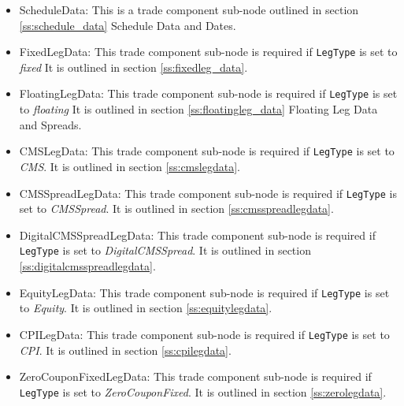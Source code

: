 \begin{itemize}
\item ScheduleData: This is a trade component sub-node outlined in section \ref{ss:schedule_data} Schedule Data and
Dates.
\item FixedLegData: This trade component sub-node is required if \lstinline!LegType! is set to \emph{fixed} It is
outlined in section \ref{ss:fixedleg_data}.
\item FloatingLegData: This trade component sub-node is required if \lstinline!LegType! is set to \emph{floating} It is
outlined in section \ref{ss:floatingleg_data} Floating Leg Data and Spreads.
\item CMSLegData: This trade component sub-node is required if \lstinline!LegType! is set to \emph{CMS}. It is
  outlined in section \ref{ss:cmslegdata}.
\item CMSSpreadLegData: This trade component sub-node is required if \lstinline!LegType! is set to \emph{CMSSpread}. It is
  outlined in section \ref{ss:cmsspreadlegdata}.
\item DigitalCMSSpreadLegData: This trade component sub-node is required if \lstinline!LegType! is set to \emph{DigitalCMSSpread}. It is
  outlined in section \ref{ss:digitalcmsspreadlegdata}.
\item EquityLegData: This trade component sub-node is required if \lstinline!LegType! is set to \emph{Equity}. It is
  outlined in section \ref{ss:equitylegdata}.    
\item CPILegData: This trade component sub-node is required if \lstinline!LegType! is set to \emph{CPI}. It is
  outlined in section \ref{ss:cpilegdata}.
\item ZeroCouponFixedLegData: This trade component sub-node is required if \lstinline!LegType! is set to \emph{ZeroCouponFixed}. It is
  outlined in section \ref{ss:zerolegdata}.
\end{itemize}
